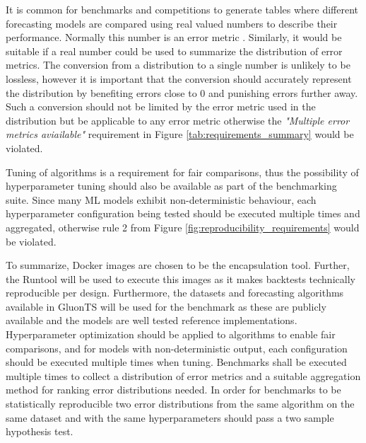 It is common for benchmarks and competitions to generate tables where different forecasting models are compared using real valued numbers to describe their performance. Normally this number is an error metric \cite{m3_competition,makridakis_m4_2020,m5,hyndman_forecasting_3rd,salinas_deepar_2019,oreshkin_n_beats_2020}. Similarly, it would be suitable if a real number could be used to summarize the distribution of error metrics. The conversion from a distribution to a single number is unlikely to be lossless, however it is important that the conversion should accurately represent the distribution by benefiting errors close to 0 and punishing errors further away. Such a conversion should not be limited by the error metric used in the distribution but be applicable to any error metric otherwise the \textit{"Multiple error metrics aviailable"} requirement in Figure \ref{tab:requirements_summary} would be violated.

Tuning of algorithms is a requirement for fair comparisons, thus the possibility of hyperparameter tuning should also be available as part of the benchmarking suite. Since many ML models exhibit non-deterministic behaviour, each hyperparameter configuration being tested should be executed multiple times and aggregated, otherwise rule 2 from Figure \ref{fig:reproducibility_requirements} would be violated.

To summarize, Docker images are chosen to be the encapsulation tool. Further, the Runtool will be used to execute this images as it makes backtests technically reproducible per design. Furthermore, the datasets and forecasting algorithms available in GluonTS will be used for the benchmark as these are publicly available and the models are well tested reference implementations. Hyperparameter optimization should be applied to algorithms to enable fair comparisons, and for models with non-deterministic output, each configuration should be executed multiple times when tuning. Benchmarks shall be executed multiple times to collect a distribution of error metrics and a suitable aggregation method for ranking error distributions needed. In order for benchmarks to be statistically reproducible two error distributions from the same algorithm on the same dataset and with the same hyperparameters should pass a two sample hypothesis test.

